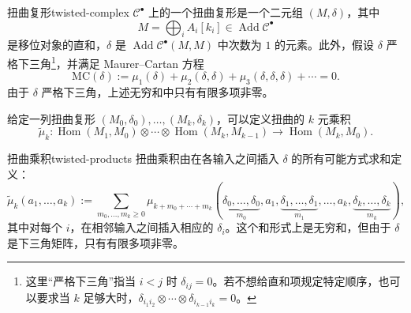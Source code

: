 \begin{definition}{扭曲复形}{twisted-complex}
$\mathcal C^\bullet$ 上的一个扭曲复形是一个二元组 $(M,\delta)$，其中
\[
  M=\bigoplus_iA_i[k_i]\in\operatorname{Add}\mathcal C^\bullet
\]
是移位对象的直和，$\delta$ 是 $\operatorname{Add}\mathcal C^\bullet(M,M)$ 中次数为 $1$ 的元素。此外，假设 $\delta$ 严格下三角\footnote{这里“严格下三角”指当 $i<j$ 时 $\delta_{ij}=0$。若不想给直和项规定特定顺序，也可以要求当 $k$ 足够大时，$\delta_{i_1i_2}\otimes\cdots\otimes\delta_{i_{k-1}i_k}=0$。}，并满足 Maurer--Cartan 方程
\[
  \mathrm{MC}(\delta)
  :=\mu_1(\delta)+\mu_2(\delta,\delta)
    +\mu_3(\delta,\delta,\delta)+\cdots=0.
\]
由于 $\delta$ 严格下三角，上述无穷和中只有有限多项非零。
\end{definition}

给定一列扭曲复形 $(M_0,\delta_0),\ldots,(M_k,\delta_k)$，可以定义扭曲的 $k$ 元乘积
\[
  \widetilde\mu_k\colon
  \operatorname{Hom}(M_1,M_0)\otimes\cdots\otimes
  \operatorname{Hom}(M_k,M_{k-1})
  \longrightarrow\operatorname{Hom}(M_k,M_0).
\]
\begin{definition}{扭曲乘积}{twisted-products}
扭曲乘积由在各输入之间插入 $\delta$ 的所有可能方式求和定义：
\[
  \widetilde\mu_k(a_1,\ldots,a_k)
  :=
  \sum_{m_0,\ldots,m_k\geq0}
  \mu_{k+m_0+\cdots+m_k}
  (\underbrace{\delta_0,\ldots,\delta_0}_{m_0},
   a_1,\underbrace{\delta_1,\ldots,\delta_1}_{m_1},\ldots,a_k,
   \underbrace{\delta_k,\ldots,\delta_k}_{m_k}),
\]
其中对每个 $i$，在相邻输入之间插入相应的 $\delta_i$。这个和形式上是无穷和，但由于 $\delta$ 是下三角矩阵，只有有限多项非零。
\end{definition}

